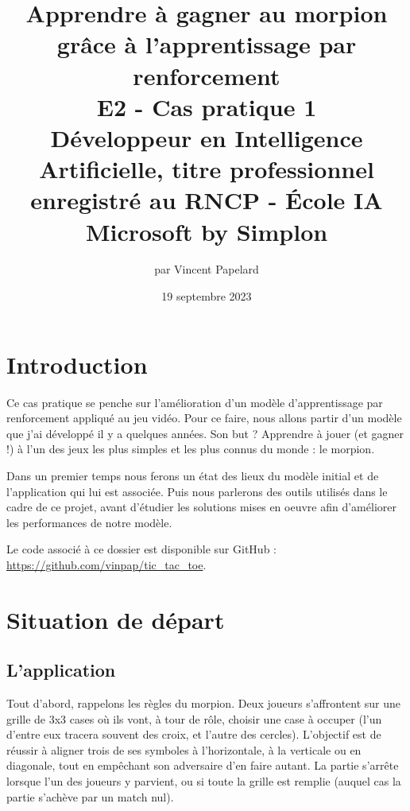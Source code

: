 \documentclass[french]{article}
\title{%
    \huge Apprendre à gagner au morpion grâce à l'apprentissage par renforcement  \\
    \bigskip
    \large E2 - Cas pratique 1 \\ 
    Développeur en Intelligence Artificielle,
    titre professionnel enregistré au RNCP - École IA Microsoft by Simplon}
\date{19 septembre 2023}
\author{par Vincent Papelard}
\begin{document}
    \maketitle
    \newpage
    \tableofcontents
    \newpage

    \section*{Introduction}
    Ce cas pratique se penche sur l'amélioration d'un modèle d'apprentissage par renforcement appliqué au jeu vidéo. Pour ce faire, nous allons partir d'un modèle que j'ai développé il y a quelques années. Son but ? Apprendre à jouer (et gagner !) à l'un des jeux les plus simples et les plus connus du monde : le morpion.
    
    Dans un premier temps nous ferons un état des lieux du modèle initial et de l'application qui lui est associée. Puis nous parlerons des outils utilisés dans le cadre de ce projet, avant d'étudier les solutions mises en oeuvre afin d'améliorer les performances de notre modèle.
    
    Le code associé à ce dossier est disponible sur GitHub : 
    \url{https://github.com/vinpap/tic_tac_toe}.

    \section{Situation de départ}
    \subsection{L'application}
    Tout d'abord, rappelons les règles du morpion. Deux joueurs s'affrontent sur une grille de 3x3 cases où ils vont, à tour de rôle, choisir une case à occuper (l'un d'entre eux tracera souvent des croix, et l'autre des cercles). L'objectif est de réussir à aligner trois de ses symboles à l'horizontale, à la verticale ou en diagonale, tout en empêchant son adversaire d'en faire autant. La partie s'arrête lorsque l'un des joueurs y parvient, ou si toute la grille est remplie (auquel cas la partie s'achève par un match nul). 
\end{document}
